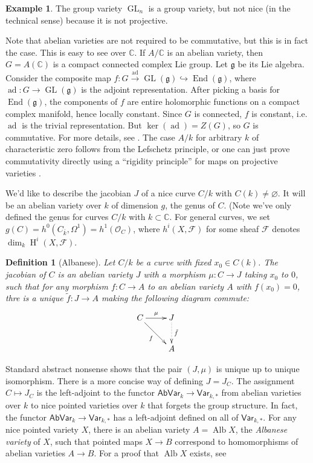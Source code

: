 \documentclass{article}
\DeclareMathOperator{\h}{H}
\newcommand{\sO}{\mathscr{O}}
\newtheorem{definition}[subsection]{Definition}
\theoremstyle{definition}
\newtheorem{example}[subsection]{Example}
\begin{document}
\begin{example}
The group variety $\operatorname{GL}_n$ is a group variety, but not nice (in 
the technical sense) because it is not projective.
\end{example}

Note that abelian varieties are not required to be commutative, but this is in 
fact the case. This is easy to see over $\mathbb{C}$. If $A/\mathbb{C}$ is an 
abelian variety, then $G=A(\mathbb{C})$ is a compact connected complex Lie 
group. Let $\mathfrak{g}$ be its Lie algebra. Consider the composite map 
$f:G\xrightarrow{\text{ad}}\operatorname{GL}(\mathfrak{g}) \hookrightarrow 
\operatorname{End}(\mathfrak{g})$, where 
$\operatorname{ad}:G\to\operatorname{GL}(\mathfrak{g})$ is the adjoint 
representation. After picking a basis for $\operatorname{End}(\mathfrak{g})$, 
the components of $f$ are entire holomorphic functions on a compact complex 
manifold, hence locally constant. Since $G$ is connected, $f$ is constant, i.e. 
$\operatorname{ad}$ is the trivial representation. But 
$\ker(\operatorname{ad}) = Z(G)$, so $G$ is commutative. For more details, see 
\cite[I.1]{mu08}. The case $A/k$ for arbitrary $k$ of characteristic zero 
follows from the Lefschetz principle, or one can just prove commutativity 
directly using a ``rigidity principle'' for maps on projective varieties
\cite[I.1.4]{mi}. 

We'd like to describe the jacobian $J$ of a nice curve $C/k$ with 
$C(k)\ne\varnothing$. It will be an abelian variety over $k$ of dimension 
$g$, the genus of $C$. (Note we've only defined the genus for curves 
$C/k$ with $k\subset\mathbb{C}$. For general curves, we set  
$g(C)=h^0(C_{\bar k},\Omega^1) = h^1(\sO_C)$, where 
$h^i(X,\mathscr{F})$ for some sheaf $\mathscr{F}$ denotes 
$\dim_k\h^i(X,\mathscr{F})$. 

\begin{definition}[Albanese]
Let $C/k$ be a curve with fixed $x_0\in C(k)$. The \emph{jacobian} of $C$ is 
an abelian variety $J$ with a morphism $\mu:C\to J$ taking $x_0$ to $0$, such 
that for any morphism $f:C\to A$ to an abelian variety $A$ with $f(x_0)=0$, 
thre is a unique $\tilde f:J\to A$ making the following diagram commute:
\[\xymatrix{
  C \ar[r]^-\mu \ar[dr]_-f 
    & J \ar@{.>}[d]^-{\tilde f} \\
  & A
}\]
\end{definition}

Standard abstract nonsense shows that the pair $(J,\mu)$ is unique up to 
unique isomorphism. There is a more concise way of defining $J=J_C$. The 
assignment $C\mapsto J_C$ is the left-adjoint to the functor 
$\mathsf{AbVar}_k\to \mathsf{Var}_{k,*}$ from abelian varieties over $k$ to 
nice pointed varieties over $k$ that forgets the group structure. In fact, the 
functor $\mathsf{AbVar}_k\to\mathsf{Var}_{k,*}$ has a left-adjoint defined 
on all of $\mathsf{Var}_{k,*}$. For any nice pointed variety $X$, there is an 
abelian variety $A=\operatorname{Alb} X$, the \emph{Albanese variety} of $X$, 
such that pointed maps $X\to B$ correspond to homomorphisms of abelian 
varieties $A\to B$. For a proof that $\operatorname{Alb} X$ exists, see 
\cite[A.11]{mo12}
\end{document}
